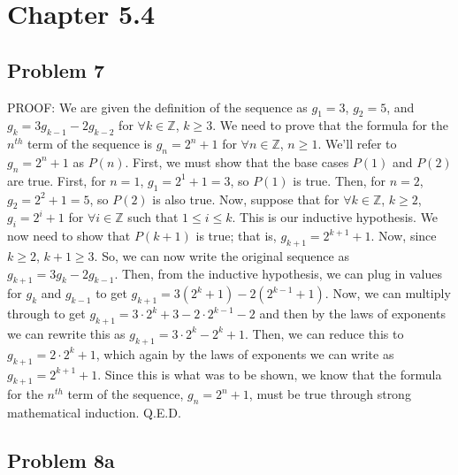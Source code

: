 \documentclass{article}
\begin{document}
\section*{Chapter 5.4}

\subsection*{Problem 7}

PROOF: We are given the definition of the sequence as $g_{1}=3$, $g_{2}=5$, and $g_{k} = 3g_{k-1} - 2g_{k-2}$ for $\forall k \in \mathbb{Z}$, $k \geq 3$. We need to prove that the formula for the $n^{th}$ term of the sequence is $g_{n} = 2^{n} +1$ for $\forall n \in \mathbb{Z}$, $n \geq 1$. We'll refer to $g_{n} = 2^{n} +1$ as $P(n)$. First, we must show that the base cases $P(1)$ and $P(2)$ are true. First, for $n=1$, $g_{1} = 2^{1} +1 = 3$, so $P(1)$ is true. Then, for $n=2$, $g_{2} = 2^{2} +1=5$, so $P(2)$ is also true. Now, suppose that for $\forall k \in \mathbb{Z}$, $k \geq 2$, $g_{i} = 2^{i} +1$ for $\forall i \in \mathbb{Z}$ such that $1 \leq i \leq k$. This is our inductive hypothesis. We now need to show that $P(k+1)$ is true; that is, $g_{k+1} = 2^{k+1} +1$. Now, since $k \geq 2$, $k+1 \geq 3$. So, we can now write the original sequence as $g_{k+1} = 3g_{k} - 2g_{k-1}$. Then, from the inductive hypothesis, we can plug in values for $g_{k}$ and $g_{k-1}$ to get $g_{k+1} = 3(2^{k}+1) - 2(2^{k-1}+1)$. Now, we can multiply through to get $g_{k+1} = 3\cdot2^{k}+3 - 2\cdot2^{k-1}-2$ and then by the laws of exponents we can rewrite this as $g_{k+1} = 3\cdot2^{k} - 2^{k}+1$. Then, we can reduce this to $g_{k+1} = 2\cdot2^{k}+1$, which again by the laws of exponents we can write as $g_{k+1} = 2^{k+1}+1$. Since this is what was to be shown, we know that the formula for the $n^{th}$ term of the sequence, $g_{n} = 2^{n} +1$, must be true through strong mathematical induction. Q.E.D.

\subsection*{Problem 8a}
\end{document}
